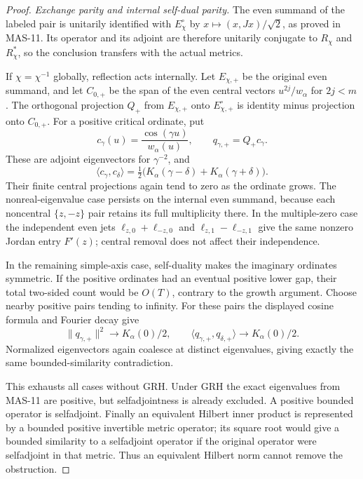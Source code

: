\documentclass[11pt,a4paper]{article}
\newcommand{\fid}[1]{\textsf{#1}}
\begin{document}
\begin{proof}
\emph{Exchange parity and internal self-dual parity.}
The even summand of the labeled pair is unitarily identified with $E_\chi^\circ$ by $x\mapsto(x,Jx)/\sqrt2$, as proved in \fid{MAS-11}. Its operator and its adjoint are therefore unitarily conjugate to $R_\chi$ and $R_\chi^*$, so the conclusion transfers with the actual metrics.

If $\chi=\chi^{-1}$ globally, reflection acts internally. Let $E_{\chi,+}$ be the original even summand, and let $C_{0,+}$ be the span of the even central vectors $u^{2j}/w_\alpha$ for $2j<m$. The orthogonal projection $Q_+$ from $E_{\chi,+}$ onto $E_{\chi,+}^\circ$ is identity minus projection onto $C_{0,+}$. For a positive critical ordinate, put
\[
 c_\gamma(u)=\frac{\cos(\gamma u)}{w_\alpha(u)},\qquad
 q_{\gamma,+}=Q_+c_\gamma.
\]
These are adjoint eigenvectors for $\gamma^{-2}$, and
\[
 \langle c_\gamma,c_\delta\rangle
 =\tfrac12\bigl(K_\alpha(\gamma-\delta)+K_\alpha(\gamma+\delta)\bigr).
\]
Their finite central projections again tend to zero as the ordinate grows. The nonreal-eigenvalue case persists on the internal even summand, because each noncentral $\{z,-z\}$ pair retains its full multiplicity there. In the multiple-zero case the independent even jets
$\ell_{z,0}+\ell_{-z,0}$ and $\ell_{z,1}-\ell_{-z,1}$ give the same nonzero Jordan entry $F'(z)$; central removal does not affect their independence.

In the remaining simple-axis case, self-duality makes the imaginary ordinates symmetric. If the positive ordinates had an eventual positive lower gap, their total two-sided count would be $O(T)$, contrary to the growth argument. Choose nearby positive pairs tending to infinity. For these pairs the displayed cosine formula and Fourier decay give
\[
 \|q_{\gamma,+}\|^2\longrightarrow K_\alpha(0)/2,\qquad
 \langle q_{\gamma,+},q_{\delta,+}\rangle\longrightarrow K_\alpha(0)/2.
\]
Normalized eigenvectors again coalesce at distinct eigenvalues, giving exactly the same bounded-similarity contradiction.

This exhausts all cases without GRH. Under GRH the exact eigenvalues from \fid{MAS-11} are positive, but selfadjointness is already excluded. A positive bounded operator is selfadjoint. Finally an equivalent Hilbert inner product is represented by a bounded positive invertible metric operator; its square root would give a bounded similarity to a selfadjoint operator if the original operator were selfadjoint in that metric. Thus an equivalent Hilbert norm cannot remove the obstruction.
\end{proof}
\end{document}
